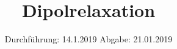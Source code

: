 

\subject{V 48}
\title{Dipolrelaxation}
\date{
  Durchführung: 14.1.2019
  \hspace{3em}
  Abgabe: 21.01.2019
}



\maketitle
\thispagestyle{empty}
\tableofcontents
\newpage






\printbibliography




